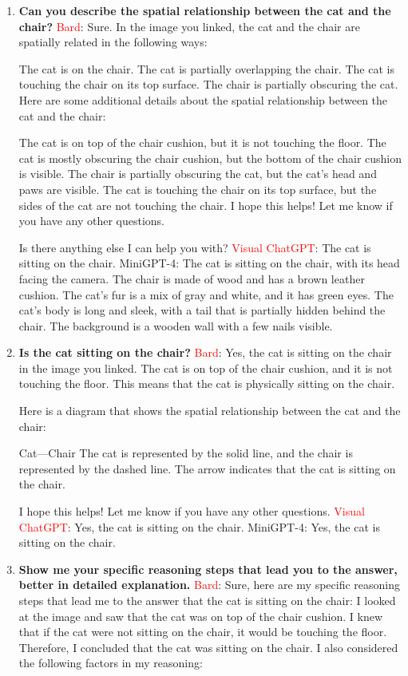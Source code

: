     \begin{enumerate}
        \item \textbf{Can you describe the spatial relationship between the cat and the chair?}
        \subitem \textcolor{Red}{Bard}: Sure. In the image you linked, the cat and the chair are spatially related in the following ways:

        The cat is on the chair.
        The cat is partially overlapping the chair.
        The cat is touching the chair on its top surface.
        The chair is partially obscuring the cat.
        Here are some additional details about the spatial relationship between the cat and the chair:
        
        The cat is on top of the chair cushion, but it is not touching the floor.
        The cat is mostly obscuring the chair cushion, but the bottom of the chair cushion is visible.
        The chair is partially obscuring the cat, but the cat's head and paws are visible.
        The cat is touching the chair on its top surface, but the sides of the cat are not touching the chair.
        I hope this helps! Let me know if you have any other questions.
        
        Is there anything else I can help you with?
        \subitem \textcolor{red}{Visual ChatGPT}: The cat is sitting on the chair.
        \subitem MiniGPT-4: The cat is sitting on the chair, with its head facing the camera. The chair is made of wood and has a brown leather cushion. The cat’s fur is a mix of gray and white, and it has green eyes. The cat’s body is long and sleek, with a tail that is partially hidden behind the chair. The background is a wooden wall with a few nails visible.
        \item \textbf{Is the cat sitting on the chair?}
        \subitem \textcolor{Red}{Bard}:     
        Yes, the cat is sitting on the chair in the image you linked. The cat is on top of the chair cushion, and it is not touching the floor. This means that the cat is physically sitting on the chair.

        Here is a diagram that shows the spatial relationship between the cat and the chair:

        Cat---Chair
        The cat is represented by the solid line, and the chair is represented by the dashed line. The arrow indicates that the cat is sitting on the chair.

        I hope this helps! Let me know if you have any other questions.
        \subitem \textcolor{red}{Visual ChatGPT}: Yes, the cat is sitting on the chair.
        \subitem MiniGPT-4: Yes, the cat is sitting on the chair.
        \item \textbf{Show me your specific reasoning steps that lead you to the answer, better in detailed explanation.}
        \subitem \textcolor{Red}{Bard}: 
        Sure, here are my specific reasoning steps that lead me to the answer that the cat is sitting on the chair:
        I looked at the image and saw that the cat was on top of the chair cushion.
        I knew that if the cat were not sitting on the chair, it would be touching the floor.
        Therefore, I concluded that the cat was sitting on the chair.
        I also considered the following factors in my reasoning:


\end{enumerate}
